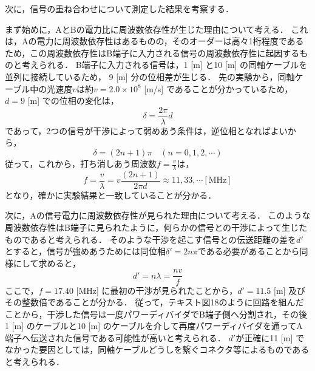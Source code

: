 \documentclass[uplatex,dvipdfmx,a4j,12pt]{jsarticle}
\begin{document}
次に，信号の重ね合わせについて測定した結果を考察する．

まず始めに，AとBの電力比に周波数依存性が生じた理由について考える．
これは，Aの電力に周波数依存性はあるものの，そのオーダーは高々1桁程度であるため，この周波数依存性はB端子に入力される信号の周波数依存性に起因するものと考えられる．
B端子に入力される信号は，1 [m] と10 [m] の同軸ケーブルを並列に接続しているため， 9 [m] 分の位相差が生じる．
先の実験から，同軸ケーブル中の光速度$v$は約$v = 2.0 \times 10^8$ [m/s] であることが分かっているため，
$d = 9$ [m] での位相の変化は，
\begin{equation}
  \delta = \frac{2\pi}{\lambda}d
\end{equation}
であって，2つの信号が干渉によって弱めあう条件は，逆位相となればよいから，
\begin{equation}
  \delta = (2n + 1)\pi \quad (n = 0, 1, 2, \cdots)
\end{equation}
従って，これから，打ち消しあう周波数$f = \frac{v}{\lambda}$は，
\begin{equation}
  f = \frac{v}{\lambda} = v \frac{(2n + 1)}{2\pi d} \approx 11, 33, \cdots \mathrm{[MHz]}
\end{equation}
となり，確かに実験結果と一致していることが分かる．

次に，Aの信号電力に周波数依存性が見られた理由について考える．
このような周波数依存性はB端子に見られたように，何らかの信号との干渉によって生じたものであると考えられる．
そのような干渉を起こす信号との伝送距離の差を$d'$とすると，信号が強めあうためには同位相$\delta' = 2n\pi$である必要があることから同様にして求めると，
\begin{equation}
  d' = n\lambda = \frac{n v}{f}
\end{equation}
ここで，$f = 17.40$ [MHz] に最初の干渉が見られたことから，$d' = 11.5$ [m] 及びその整数倍であることが分かる．
従って，テキスト図18のように回路を組んだことから，干渉した信号は一度パワーディバイダでB端子側へ分割され，その後1 [m] のケーブルと10 [m] のケーブルを介して再度パワーディバイダを通ってA端子へ伝送された信号である可能性が高いと考えられる．
$d'$が正確に11 [m] でなかった要因としては，同軸ケーブルどうしを繋ぐコネクタ等によるものであると考えられる．

\end{document}
